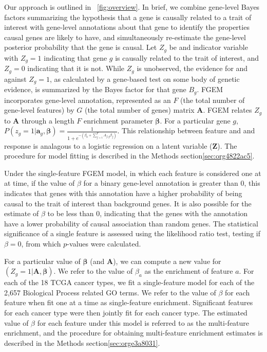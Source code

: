 Our approach is outlined in ~\ref{fig:overview}. In brief, we combine gene-level Bayes factors summarizing the hypothesis that a gene is causally related to a trait of interest with gene-level annotations about that gene to identify the properties causal genes are likely to have, and simultaneously re-estimate the gene-level posterior probability that the gene is causal.  Let $Z_g$ be and indicator variable with $Z_g = 1$ indicating that gene $g$ is causally related to the trait of interest, and $Z_g = 0$ indicating that it is not.  While $Z_g$ is unobserved, the evidence for and against $Z_g=1$, as calculated by a gene-based test on some body of genetic evidence, is summarized by the Bayes factor for that gene $B_g$.  FGEM incorporates gene-level annotation, represented as an $F$ (the total number of gene-level features) by $G$ (the total number of genes) matrix $\textbf{A}$. FGEM relates $Z_g$ to $\textbf{A}$ through a length $F$  enrichment parameter $\boldsymbol{\beta}$.  For a particular gene $g$, $P(z_g=1|\textbf{a}_g,\boldsymbol{\beta}) =  \frac{1}{1+e^{-(\beta_{0}+\sum_{f=1}^F{A_{f,g}\beta_f})}} $.  This relationship between feature and and response is analagous to a logistic regression on a latent variable ($\textbf{Z}$).  The procedure for model fitting is described in the Methods section\ref{sec:org4822ac5}.

Under the single-feature FGEM model, in which each feature is considered one at at time, if the value of $\beta$ for a binary gene-level annotation is greater than $0$, this indicates that genes with this annotation have a higher probability of being causal to the trait of interest than background genes.  %
It is also possible for the estimate of $\beta$ to be less than $0$, indicating that the genes with the annotation have a lower probability of causal association than random genes.  The statistical significance of a single feature is assessed using the likelihood ratio test, testing if $\beta = 0$, from which $p$-values were calculated.

For a particular value of $\boldsymbol{\beta}$ (and $\textbf{A}$), we can compute a new value for $(Z_g = 1 | \textbf{A},\boldsymbol{\beta})$.
We refer to the value of $\beta_a$ as the enrichment of feature $a$.  For each of the 18 TCGA cancer types, we fit a single-feature model for each of the 2,657 Biological Process related GO terms.  We refer to the value of $\beta$ for each feature when fit one at a time as single-feature enrichment.  Significant features for each cancer type were then jointly fit for each cancer type.  The estimated value of $\beta$ for each feature under this model is referred to as the multi-feature enrichment, and the procedure for obtaining multi-feature enrichment estimates is described in the Methods section\ref{sec:orge3a8031}.


